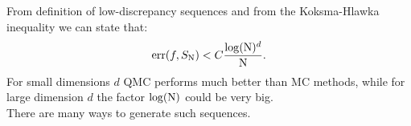 From definition of low-discrepancy sequences and from the Koksma-Hlawka inequality we can state that:
\begin{equation}
\textrm{err}(f, S_{\textrm{N}})<C \frac{\log(\textrm{N})^d}{\textrm{N}}.
\end{equation}
For small dimensions $d$ QMC performs much better than MC methods, while for large dimension $d$ the factor $\log(\textrm{N})$ could be very big.
\\ \indent There are many ways to generate such sequences.

